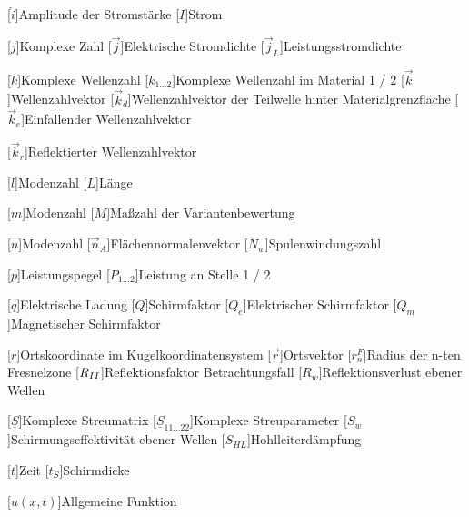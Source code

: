 \begin{acronym}[Platzhalterwort]
[$\hat i$]{\acrounit{\ampere}Amplitude der Stromstärke}
[$I$]{\acrounit{\ampere}Strom}

[$j$]{\acrounit{-}Komplexe Zahl}
[$\vec j$]{\acrounit{\ampere\per\square\meter}Elektrische Stromdichte}
[$\vec j_L$]{\acrounit{\ampere\per\square\meter}Leistungsstromdichte}

[$k$]{\acrounit{-}Komplexe Wellenzahl}
[$k_{1\ldots2}$]{\acrounit{-}Komplexe Wellenzahl im Material 1 / 2}
[$\vec k$]{\acrounit{-}Wellenzahlvektor}
[$\vec k_d$]{\acrounit{-}Wellenzahlvektor der Teilwelle hinter Materialgrenzfläche}
[$\vec k_e$]{\acrounit{-}Einfallender Wellenzahlvektor}

[$\vec k_r$]{\acrounit{-}Reflektierter Wellenzahlvektor}

[$l$]{Modenzahl}
[$L$]{\acrounit{\meter}Länge}

[$m$]{Modenzahl}
[$M$]{\acrounit{-}Maßzahl der Variantenbewertung}

[$n$]{Modenzahl}
[$\vec n_A$]{Flächennormalenvektor}
[$N_w$]{Spulenwindungszahl}

[$p$]{\acrounit{\Dezibel}Leistungspegel}
[$P_{1\ldots2}$]{\acrounit{\watt}Leistung an Stelle 1 / 2}

[$q$]{\acrounit{\ampere\second}Elektrische Ladung}
[$Q$]{\acrounit{-}Schirmfaktor}
[$Q_e$]{\acrounit{-}Elektrischer Schirmfaktor}
[$Q_m$]{\acrounit{-}Magnetischer Schirmfaktor}

[$r$]{\acrounit{-}Ortskoordinate im Kugelkoordinatensystem}
[$\vec r$]{Ortsvektor}
[$r^F_n$]{\acrounit{\meter}Radius der n-ten Fresnelzone}
[$R_{\uproman{2}}$]{Reflektionsfaktor Betrachtungsfall }
[$R_w$]{\acrounit{\Dezibel}Reflektionsverlust ebener Wellen}

[$\underline{S}$]{\acrounit{-}Komplexe Streumatrix}
[$\underline{S}_{11\ldots22}$]{\acrounit{-}Komplexe Streuparameter}
[$S_w$]{\acrounit{\Dezibel}Schirmungseffektivität ebener Wellen}
[$S_{HL}$]{\acrounit{\Dezibel}Hohlleiterdämpfung}

[$t$]{\acrounit{\second}Zeit}
[$t_S$]{\acrounit{\meter}Schirmdicke}

[$u(x,t)$]{\acrounit{-}Allgemeine Funktion}


\end{acronym}

